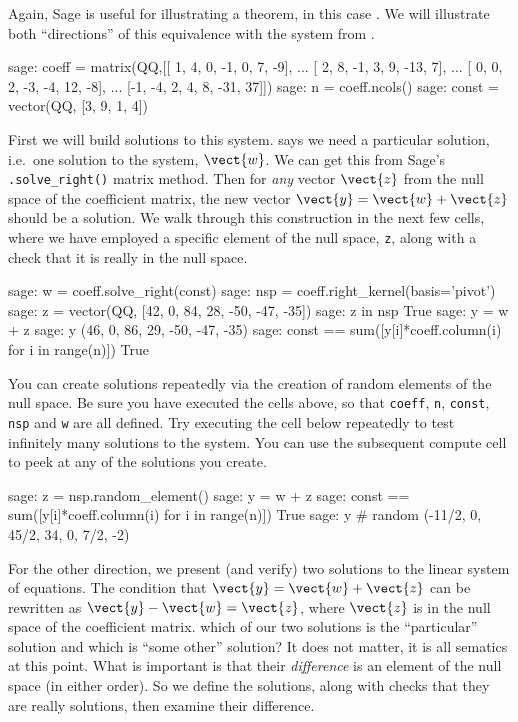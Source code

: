 Again, Sage is useful for illustrating a theorem, in this case .  We will illustrate both ``directions'' of this equivalence with the system from .
%
\begin{sageexample}
sage: coeff = matrix(QQ,[[ 1,  4,  0, -1,  0,   7, -9],
...                      [ 2,  8, -1,  3,  9, -13,  7],
...                      [ 0,  0,  2, -3, -4,  12, -8],
...                      [-1, -4,  2,  4,  8, -31, 37]])
sage: n = coeff.ncols()
sage: const = vector(QQ, [3, 9, 1, 4])
\end{sageexample}
%
First we will build solutions to this system.   says we need a particular solution, i.e.\ one solution to the system, $\vect{w}$.  We can get this from Sage's \verb?.solve_right()? matrix method.  Then for \emph{any} vector $\vect{z}$ from the null space of the coefficient matrix, the new vector $\vect{y}=\vect{w}+\vect{z}$ should be a solution.  We walk through this construction in the next few cells, where we have employed a specific element of the null space, \verb?z?, along with a check that it is really in the null space.
%
\begin{sageexample}
sage: w = coeff.solve_right(const)
sage: nsp = coeff.right_kernel(basis='pivot')
sage: z = vector(QQ, [42, 0, 84, 28, -50, -47, -35])
sage: z in nsp
True
sage: y = w + z
sage: y
(46, 0, 86, 29, -50, -47, -35)
sage: const == sum([y[i]*coeff.column(i) for i in range(n)])
True
\end{sageexample}
%
You can create solutions repeatedly via the creation of random elements of the null space.  Be sure you have executed the cells above, so that \verb?coeff?, \verb?n?, \verb?const?, \verb?nsp? and \verb?w? are all defined.  Try executing the cell below repeatedly to test infinitely many solutions to the system.  You can use the subsequent compute cell to peek at any of the solutions you create.
%
\begin{sageexample}
sage: z = nsp.random_element()
sage: y = w + z
sage: const == sum([y[i]*coeff.column(i) for i in range(n)])
True
sage: y     # random
(-11/2, 0, 45/2, 34, 0, 7/2, -2)
\end{sageexample}
%
For the other direction, we present (and verify) two solutions to the linear system of equations.  The condition that $\vect{y}=\vect{w}+\vect{z}$ can be rewritten as $\vect{y}-\vect{w}=\vect{z}$, where $\vect{z}$ is in the null space of the coefficient matrix.  which of our two solutions is the ``particular'' solution and which is ``some other'' solution?  It does not matter, it is all sematics at this point.  What is important is that their \emph{difference} is an element of the null space (in either order).  So we define the solutions, along with checks that they are really solutions, then examine their difference.
